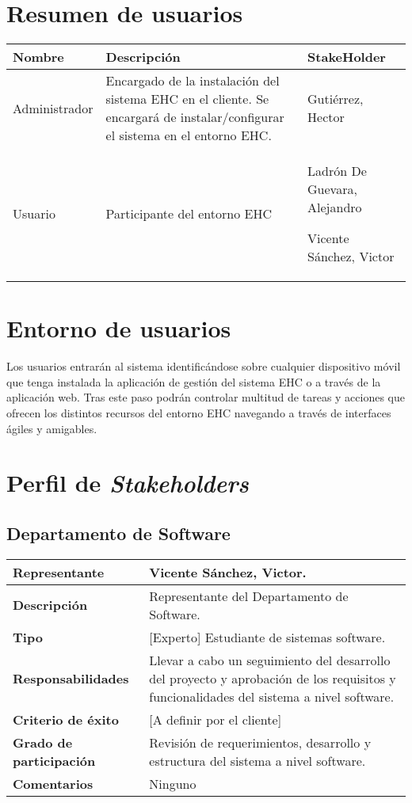 \section{Resumen de usuarios}
    \begin{tabular}{|p{3cm}|p{7cm}|p{6cm}|}
        \hline \textbf{Nombre} &  \textbf{Descripción} & \textbf{StakeHolder} \\
        \hline Administrador & Encargado de la instalación del sistema EHC en el cliente. Se encargará de  instalar/configurar el sistema en el entorno EHC. & Gutiérrez, Hector \\
        \hline Usuario & Participante del entorno EHC &   Ladrón De Guevara, Alejandro \par Vicente Sánchez, Victor \\
        \hline
    \end{tabular}

\section{Entorno de usuarios}
    Los usuarios entrarán al sistema identificándose sobre cualquier dispositivo móvil que tenga instalada la aplicación de gestión del sistema EHC o a través de la aplicación web. Tras este paso podrán controlar multitud de tareas y acciones que ofrecen los distintos recursos del entorno EHC navegando a través de interfaces ágiles y amigables.

\section{Perfil de \textit{Stakeholders}}
    \subsection{Departamento de Software}
        \begin{tabular}{|p{4cm}|p{12cm}|}
            \hline \textbf{Representante} & Vicente Sánchez, Victor. \\
            \hline \textbf{Descripción} & Representante del Departamento de Software. \\
            \hline \textbf{Tipo} &  [Experto] Estudiante de sistemas software. \\
            \hline \textbf{Responsabilidades} &  Llevar a cabo un seguimiento del desarrollo del proyecto y aprobación de  los requisitos y funcionalidades del sistema a nivel software.\\
            \hline \textbf{Criterio de éxito} &  [A definir por el cliente]\\
            \hline \textbf{Grado de participación} &  Revisión de requerimientos, desarrollo y estructura del sistema a nivel software.\\
            \hline \textbf{Comentarios} &  Ninguno\\
            \hline
        \end{tabular}

